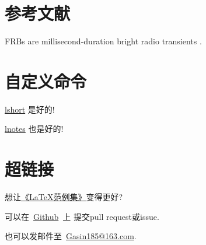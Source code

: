 \documentclass{ctexart}
\begin{document}
    \section{参考文献}
    FRBs are millisecond-duration bright radio transients
    \cite{Li2018,Lin2020}.
    
    
    \section{自定义命令}
    \newcommand{\isgood}[3][是好的]{\href{#3}{#2} #1!}

    \isgood{lshort}{https://www.ctan.org/pkg/lshort}

    \isgood[也是好的]{lnotes}{https://github.com/huangxg/lnotes}
    \section{超链接}
    想让\href{clexample.pdf}{《\LaTeX{}范例集》}变得更好?

    可以在~\href{https://github.com/GasinAn/lexamples}{Github}~上
    提交pull request或issue.

    也可以发邮件至~\href{mailto:Gasin185@163.com}{Gasin185@163.com}.
\end{document}
